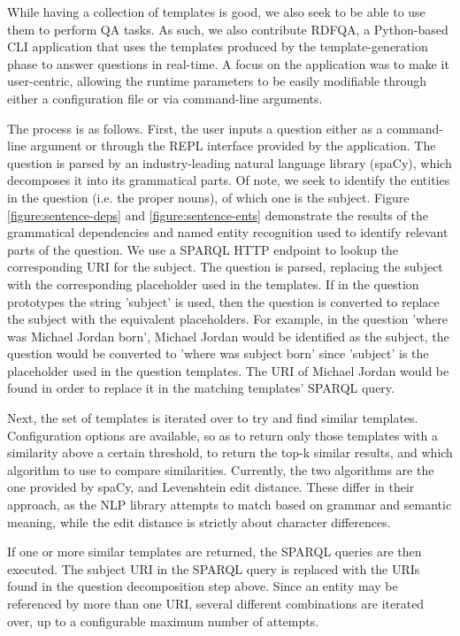 \documentclass[sigplan,screen]{acmart}
\begin{document}
While having a collection of templates is good, we also seek to be able to use them to perform QA tasks. As such, we also contribute RDFQA, a Python-based CLI application that uses the templates produced by the template-generation phase to answer questions in real-time. A focus on the application was to make it user-centric, allowing the runtime parameters to be easily modifiable through either a configuration file or via command-line arguments.

The process is as follows. First, the user inputs a question either as a command-line argument or through the REPL interface provided by the application. The question is parsed by an industry-leading natural language library (spaCy), which decomposes it into its grammatical parts. Of note, we seek to identify the entities in the question (i.e. the proper nouns), of which one is the subject. Figure \ref{figure:sentence-deps} and \ref{figure:sentence-ents} demonstrate the results of the grammatical dependencies and named entity recognition used to identify relevant parts of the question. We use a SPARQL HTTP endpoint to lookup the corresponding URI for the subject. The question is parsed, replacing the subject with the corresponding placeholder used in the templates. If in the question prototypes the string '{subject}' is used, then the question is converted to replace the subject with the equivalent placeholders. For example, in the question 'where was Michael Jordan born', Michael Jordan would be identified as the subject, the question would be converted to 'where was {subject} born' since '{subject}' is the placeholder used in the question templates. The URI of Michael Jordan would be found in order to replace it in the matching templates' SPARQL query.

Next, the set of templates is iterated over to try and find similar templates. Configuration options are available, so as to return only those templates with a similarity above a certain threshold, to return the top-k similar results, and which algorithm to use to compare similarities. Currently, the two algorithms are the one provided by spaCy, and Levenshtein edit distance. These differ in their approach, as the NLP library attempts to match based on grammar and semantic meaning, while the edit distance is strictly about character differences.

If one or more similar templates are returned, the SPARQL queries are then executed. The subject URI in the SPARQL query is replaced with the URIs found in the question decomposition step above. Since an entity may be referenced by more than one URI, several different combinations are iterated over, up to a configurable maximum number of attempts.
\end{document}
